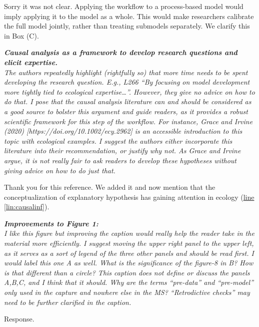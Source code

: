 \documentclass[11pt,letter]{article}
\begin{document}
Sorry it was not clear. Applying the workflow to a process-based model would imply applying it to the model as a whole. This would make researchers calibrate the full model jointly, rather than treating submodels separately. We clarify this in Box (C).

\begin{mybox}
\emph{\textbf{Causal analysis as a framework to develop research questions and elicit expertise.}\\
The authors repeatedly highlight (rightfully so) that more time needs to be spent developing the research question. E.g., L266 “By focusing on model development more tightly tied to ecological expertise…”. However, they give no advice on how to do that. I pose that the causal analysis literature can and should be considered as a good source to bolster this argument and guide readers, as it provides a robust scientific framework for this step of the workflow. For instance, Grace and Irvine (2020) [https://doi.org/10.1002/ecy.2962] is an accessible introduction to this topic with ecological examples. I suggest the authors either incorporate this literature into their recommendation, or justify why not. As Grace and Irvine argue, it is not really fair to ask readers to develop these hypotheses without giving advice on how to do just that.}
\end{mybox}

Thank you for this reference. We added it and now mention that the conceptualization of explanatory hypothesis has gaining attention in ecology (\href{file:forecastflows_r1\#lintarget:causalinf}{line \ref*{lin:causalinf}}).

\begin{mybox}
\emph{\textbf{Improvements to Figure 1:}\\
I like this figure but improving the caption would really help the reader take in the material more efficiently. I suggest moving the upper right panel to the upper left, as it serves as a sort of legend of the three other panels and should be read first. I would label this one A as well. What is the significance of the figure-8 in B? How is that different than a circle? This caption does not define or discuss the panels A,B,C, and I think that it should. Why are the terms “pre-data” and “pre-model” only used in the capture and nowhere else in the MS? “Retrodictive checks” may need to be further clarified in the caption.}
\end{mybox}

Response.
\end{document}
